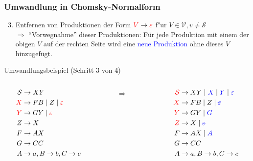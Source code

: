 \begin{frame}
\frametitle{Umwandlung in Chomsky-Normalform}
\begin{enumerate}
\setcounter{enumi}{2}
\item Entfernen von Produktionen der Form $\textcolor{red}{V} \rightarrow \textcolor{red}{\varepsilon}$
f"ur $V \in \mathcal{V}, v \neq \mathcal{S}$ \\ $\Rightarrow$ "`Vorwegnahme"' dieser Produktionen: Für jede Produktion mit einem der obigen $V$
auf der rechten Seite wird eine \textcolor{blue}{neue Produktion} ohne dieses $V$ hinzugefügt.
\end{enumerate}

\begin{exampleblock}{Umwandlungsbeispiel (Schritt 3 von 4)}
\ducttape{-0.25cm}
\begin{columns}[c]
\begin{column}{0.3\textwidth}
\begin{align*}
\mathcal{S} &\rightarrow XY\\
\textcolor{red}{X} &\rightarrow FB \mid Z \mid \textcolor{red}{\varepsilon}\\
\textcolor{red}{Y} &\rightarrow GY \mid \textcolor{red}{\varepsilon}\\
Z &\rightarrow X\\
F &\rightarrow AX\\
G &\rightarrow CC\\
A &\rightarrow a, B \rightarrow b, C \rightarrow c\\
\end{align*}
\end{column}
%
\
\begin{column}{0.05\textwidth}
$\Rightarrow$
\end{column}
%
\begin{column}{0.3\textwidth}
\begin{align*}
\textcolor{red}{\mathcal{S}} &\rightarrow XY \mid \textcolor{blue}{X} \mid  \textcolor{blue}{Y} \mid \textcolor{blue}{\varepsilon}\\
\textcolor{red}{X} &\rightarrow FB \mid Z \mid \textcolor{blue}{\msout{\varepsilon}}\\
\textcolor{red}{Y} &\rightarrow GY \mid \textcolor{blue}{G}\\
\textcolor{red}{Z} &\rightarrow X\mid \textcolor{blue}{\msout{\varepsilon}}\\
F &\rightarrow AX \mid \textcolor{blue}{A}\\
G &\rightarrow CC\\
A &\rightarrow a, B \rightarrow b, C \rightarrow c\\
\end{align*}
\end{column}
\end{columns}
\end{exampleblock}
\end{frame}




